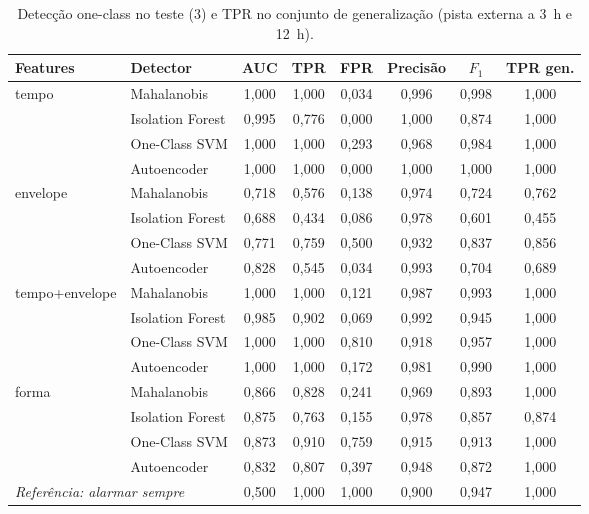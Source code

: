 \begin{table}[htb]
  \centering
  \caption{Detecção one-class no teste (\SI{3}{\hp}) e TPR no conjunto de
  generalização (pista externa a 3~h e 12~h).}
  \label{tab:deteccao}
  \footnotesize
  \begin{tabular}{llcccccc}
    \toprule
    \textbf{Features} & \textbf{Detector} & \textbf{AUC} & \textbf{TPR} &
    \textbf{FPR} & \textbf{Precisão} & \textbf{$F_1$} & \textbf{TPR gen.} \\
    \midrule
    tempo          & Mahalanobis      & 1,000 & 1,000 & 0,034 & 0,996 & 0,998 & 1,000 \\
                   & Isolation Forest & 0,995 & 0,776 & 0,000 & 1,000 & 0,874 & 1,000 \\
                   & One-Class SVM    & 1,000 & 1,000 & 0,293 & 0,968 & 0,984 & 1,000 \\
                   & Autoencoder      & 1,000 & 1,000 & 0,000 & 1,000 & 1,000 & 1,000 \\
    \midrule
    envelope       & Mahalanobis      & 0,718 & 0,576 & 0,138 & 0,974 & 0,724 & 0,762 \\
                   & Isolation Forest & 0,688 & 0,434 & 0,086 & 0,978 & 0,601 & 0,455 \\
                   & One-Class SVM    & 0,771 & 0,759 & 0,500 & 0,932 & 0,837 & 0,856 \\
                   & Autoencoder      & 0,828 & 0,545 & 0,034 & 0,993 & 0,704 & 0,689 \\
    \midrule
    tempo+envelope & Mahalanobis      & 1,000 & 1,000 & 0,121 & 0,987 & 0,993 & 1,000 \\
                   & Isolation Forest & 0,985 & 0,902 & 0,069 & 0,992 & 0,945 & 1,000 \\
                   & One-Class SVM    & 1,000 & 1,000 & 0,810 & 0,918 & 0,957 & 1,000 \\
                   & Autoencoder      & 1,000 & 1,000 & 0,172 & 0,981 & 0,990 & 1,000 \\
    \midrule
    forma          & Mahalanobis      & 0,866 & 0,828 & 0,241 & 0,969 & 0,893 & 1,000 \\
                   & Isolation Forest & 0,875 & 0,763 & 0,155 & 0,978 & 0,857 & 0,874 \\
                   & One-Class SVM    & 0,873 & 0,910 & 0,759 & 0,915 & 0,913 & 1,000 \\
                   & Autoencoder      & 0,832 & 0,807 & 0,397 & 0,948 & 0,872 & 1,000 \\
    \midrule
    \multicolumn{2}{l}{\emph{Referência: alarmar sempre}} & 0,500 & 1,000 & 1,000 & 0,900 & 0,947 & 1,000 \\
    \bottomrule
  \end{tabular}
\end{table}

